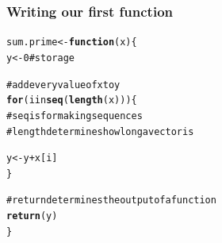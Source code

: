 \documentclass{beamer}\usepackage{graphicx, color}
\makeatletter
\newcommand{\hlfunctioncall}[1]{\textcolor[rgb]{0.501960784313725,0,0.329411764705882}{\textbf{#1}}}%
\newcommand{\hlcomment}[1]{\textcolor[rgb]{0.180392156862745,0.6,0.341176470588235}{#1}}%
\newenvironment{kframe}{%
 \def\at@end@of@kframe{}%
 \ifinner\ifhmode%
  \def\at@end@of@kframe{\end{minipage}}%
  \begin{minipage}{\columnwidth}%
 \fi\fi%
 \def\FrameCommand##1{\hskip\@totalleftmargin \hskip-\fboxsep
 \colorbox{shadecolor}{##1}\hskip-\fboxsep
     \hskip-\linewidth \hskip-\@totalleftmargin \hskip\columnwidth}%
 \MakeFramed {\advance\hsize-\width
   \@totalleftmargin\z@ \linewidth\hsize
   \@setminipage}}%
 {\par\unskip\endMakeFramed%
 \at@end@of@kframe}
\newenvironment{knitrout}{}{} %
\makeatother
\begin{document}
\begin{frame}[fragile]
  \frametitle{Writing our first function}

\begin{knitrout}\small
{}\color{fgcolor}\begin{kframe}
\begin{alltt}
sum.prime <- \hlfunctioncall{function}(x) \{
  y <- 0  \hlcomment{# storage}

\hlcomment{  # add every value of x to y}
  \hlfunctioncall{for}(i in \hlfunctioncall{seq}(\hlfunctioncall{length}(x))) \{  
\hlcomment{    # seq is for making sequences }
\hlcomment{    # length determines how long a vector is}
    
    y <- y + x[i]
  \}

\hlcomment{  # return determines the output of a function}
  \hlfunctioncall{return}(y)
\}
\end{alltt}
\end{kframe}
\end{knitrout}


\end{frame}
\end{document}
